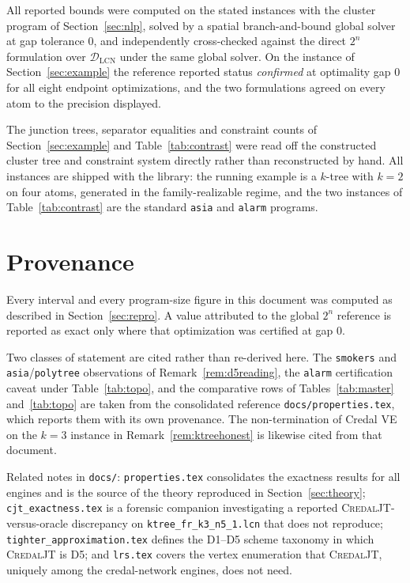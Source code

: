 \documentclass[11pt]{article}
\theoremstyle{definition}
\newcommand{\DLCN}{\mathcal{D}_{\mathrm{LCN}}}
\begin{document}
All reported bounds were computed on the stated instances with the cluster program
of Section~\ref{sec:nlp}, solved by a spatial branch-and-bound global solver at
gap tolerance $0$, and independently cross-checked against the direct $2^n$
formulation over $\DLCN$ under the same global solver. On the instance of
Section~\ref{sec:example} the reference reported status \emph{confirmed} at
optimality gap $0$ for all eight endpoint optimizations, and the two formulations
agreed on every atom to the precision displayed.

The junction trees, separator equalities and constraint counts of
Section~\ref{sec:example} and Table~\ref{tab:contrast} were read off the
constructed cluster tree and constraint system directly rather than reconstructed
by hand. All instances are shipped with the library: the running example is a
$k$-tree with $k=2$ on four atoms, generated in the family-realizable regime, and
the two instances of Table~\ref{tab:contrast} are the standard \texttt{asia} and
\texttt{alarm} programs.

\section{Provenance}\label{sec:provenance}

Every interval and every program-size figure in this document was computed as
described in Section~\ref{sec:repro}. A value attributed to the global $2^n$
reference is reported as exact only where that optimization was certified at gap
$0$.

Two classes of statement are cited rather than re-derived here. The
\texttt{smokers} and \texttt{asia}/\texttt{polytree} observations of
Remark~\ref{rem:d5reading}, the \texttt{alarm} certification caveat under
Table~\ref{tab:topo}, and the comparative rows of Tables~\ref{tab:master}
and~\ref{tab:topo} are taken from the consolidated reference
\texttt{docs/properties.tex}, which reports them with its own provenance. The
non-termination of Credal VE on the $k{=}3$ instance in
Remark~\ref{rem:ktreehonest} is likewise cited from that document.

Related notes in \texttt{docs/}: \texttt{properties.tex} consolidates the
exactness results for all engines and is the source of the theory reproduced in
Section~\ref{sec:theory}; \texttt{cjt\_exactness.tex} is a forensic companion
investigating a reported \textsc{CredalJT}-versus-oracle discrepancy on
\texttt{ktree\_fr\_k3\_n5\_1.lcn} that does not reproduce;
\texttt{tighter\_approximation.tex} defines the D1--D5 scheme taxonomy in which
\textsc{CredalJT} is D5; and \texttt{lrs.tex} covers the vertex enumeration that
\textsc{CredalJT}, uniquely among the credal-network engines, does not need.
\end{document}
